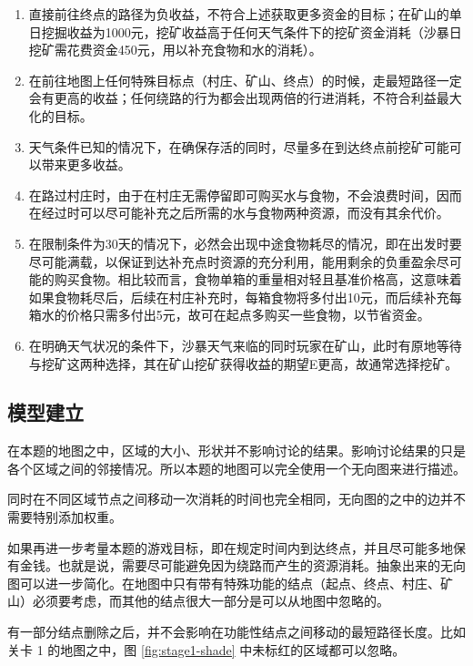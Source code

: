 \documentclass[a4paper]{ctexart}
\begin{document}
\begin{enumerate}
    \item 直接前往终点的路径为负收益，不符合上述获取更多资金的目标；在矿山的单日挖掘收益为1000元，挖矿收益高于任何天气条件下的挖矿资金消耗（沙暴日挖矿需花费资金450元，用以补充食物和水的消耗）。
    \item 在前往地图上任何特殊目标点（村庄、矿山、终点）的时候，走最短路径一定会有更高的收益；任何绕路的行为都会出现两倍的行进消耗，不符合利益最大化的目标。
    \item 天气条件已知的情况下，在确保存活的同时，尽量多在到达终点前挖矿可能可以带来更多收益。
    \item 在路过村庄时，由于在村庄无需停留即可购买水与食物，不会浪费时间，因而在经过时可以尽可能补充之后所需的水与食物两种资源，而没有其余代价。
    \item 在限制条件为30天的情况下，必然会出现中途食物耗尽的情况，即在出发时要尽可能满载，以保证到达补充点时资源的充分利用，能用剩余的负重盈余尽可能的购买食物。相比较而言，食物单箱的重量相对轻且基准价格高，这意味着如果食物耗尽后，后续在村庄补充时，每箱食物将多付出10元，而后续补充每箱水的价格只需多付出5元，故可在起点多购买一些食物，以节省资金。
    \item 在明确天气状况的条件下，沙暴天气来临的同时玩家在矿山，此时有原地等待与挖矿这两种选择，其在矿山挖矿获得收益的期望E更高，故通常选择挖矿。
\end{enumerate}


\subsection{模型建立}

在本题的地图之中，区域的大小、形状并不影响讨论的结果。影响讨论结果的只是各个区域之间的邻接情况。所以本题的地图可以完全使用一个无向图来进行描述。

同时在不同区域节点之间移动一次消耗的时间也完全相同，无向图的之中的边并不需要特别添加权重。

如果再进一步考量本题的游戏目标，即在规定时间内到达终点，并且尽可能多地保有金钱。也就是说，需要尽可能避免因为绕路而产生的资源消耗。抽象出来的无向图可以进一步简化。在地图中只有带有特殊功能的结点（起点、终点、村庄、矿山）必须要考虑，而其他的结点很大一部分是可以从地图中忽略的。

有一部分结点删除之后，并不会影响在功能性结点之间移动的最短路径长度。比如关卡 1 的地图之中，图 \ref{fig:stage1-shade} 中未标红的区域都可以忽略。
\end{document}
